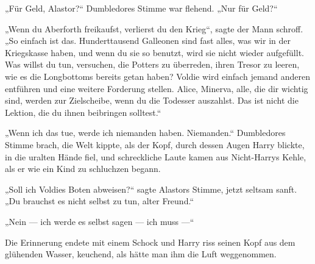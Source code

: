 \begin{em}
„Für Geld, Alastor?“ Dumbledores Stimme war flehend.
„Nur für Geld?“

„Wenn du Aberforth freikaufst, verlierst du den Krieg“, sagte der Mann schroff.
„So einfach ist das. Hunderttausend Galleonen sind fast alles, was wir in der Kriegskasse haben, und wenn du sie so benutzt, wird sie nicht wieder aufgefüllt. Was willst du tun, versuchen, die Potters zu überreden, ihren Tresor zu leeren, wie es die Longbottoms bereits getan haben? Voldie wird einfach jemand anderen entführen und eine weitere Forderung stellen. Alice, Minerva, alle, die dir wichtig sind, werden zur Zielscheibe, wenn du die Todesser auszahlst. Das ist nicht die Lektion, die du ihnen beibringen solltest.“

„Wenn ich das tue, werde ich niemanden haben. Niemanden.“ Dumbledores Stimme brach, die Welt kippte, als der Kopf, durch dessen Augen Harry blickte, in die uralten Hände fiel, und schreckliche Laute kamen aus Nicht-Harrys Kehle, als er wie ein Kind zu schluchzen begann.

„Soll ich Voldies Boten abweisen?“ sagte Alastors Stimme, jetzt seltsam sanft.
„Du brauchst es nicht selbst zu tun, alter Freund.“

„Nein — ich werde es selbst sagen — ich muss —“
\end{em}

\later

Die Erinnerung endete mit einem Schock und Harry riss seinen Kopf aus dem glühenden Wasser, keuchend, als hätte man ihm die Luft weggenommen.

